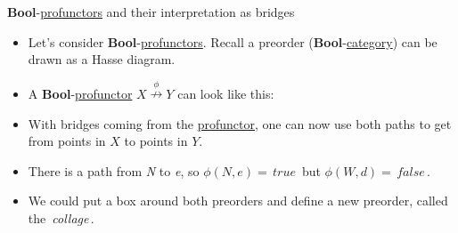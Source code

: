 \textbf{Bool}-\href{doc/1 math/Seven Sketches in Compositionality/Chapter 4: Co-design/2 Enriched profunctors/2 V-profunctors/1 V-profunctor}{profunctors} and their interpretation as bridges

  \begin{itemize}
    \item Let's consider \textbf{Bool}-\href{doc/1 math/Seven Sketches in Compositionality/Chapter 4: Co-design/2 Enriched profunctors/2 V-profunctors/1 V-profunctor}{profunctors}. Recall a preorder (\textbf{Bool}-\href{doc/1 math/Seven Sketches in Compositionality/Chapter 2: Resource theories/3 Enrichment/1 V-categories/1 V-category}{category}) can be drawn as a Hasse diagram.
    \item A \textbf{Bool}-\href{doc/1 math/Seven Sketches in Compositionality/Chapter 4: Co-design/2 Enriched profunctors/2 V-profunctors/1 V-profunctor}{profunctor} $X \overset{\phi}{\nrightarrow} Y$ can look like this:



    \item With bridges coming from the \href{doc/1 math/Seven Sketches in Compositionality/Chapter 4: Co-design/2 Enriched profunctors/2 V-profunctors/1 V-profunctor}{profunctor}, one can now use both paths to get from points in $X$ to points in $Y$.
    \item There is a path from \emph{N} to \emph{e}, so $\phi(N,e)=$\,$true$\, but $\phi(W,d)=$\,$false$\,.
    \item We could put a box around both preorders and define a new preorder, called the \,\emph{collage}\,.

  \end{itemize}